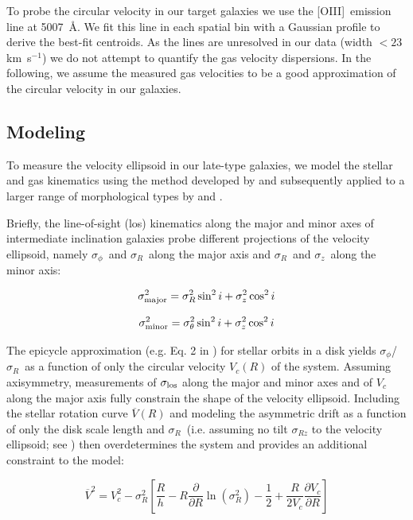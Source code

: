 \documentclass[useAMS,usenatbib]{mn2e}
\newcommand{\kms}{km~s$^{-1}$}
\newcommand{\oiii}{[O{\small III}]}			%
\newcommand{\sz}{$\sigma_z$}
\newcommand{\sr}{$\sigma_R$}
\newcommand{\st}{$\sigma_\phi$}
\begin{document}
To probe the circular velocity in our target galaxies we use the
\oiii\ emission line at 5007~\AA.  We fit this line in each spatial
bin with a Gaussian profile to derive the best-fit centroids.  As the
lines are unresolved in our data (width $<23$ \kms) we do not attempt
to quantify the gas velocity dispersions.  In the following, we assume
the measured gas velocities to be a good approximation of the circular
velocity in our galaxies.




\subsection{Modeling}
\label{Modeling}

To measure the velocity ellipsoid in our late-type galaxies, we model
the stellar and gas kinematics using the method developed by
\citet{Gerssen1997} and subsequently applied to a larger range of
morphological types by \citet{Gerssen2000} and \citet{Shapiro2003}.  

Briefly, the line-of-sight (los) kinematics along the major and minor
axes of intermediate inclination galaxies probe different projections of
the velocity ellipsoid, namely \st\ and \sr\ along the major axis and
\sr\ and \sz\ along the minor axis:

\begin{equation}
\sigma^2_{\rm major} = \sigma_R^2 \sin^2 i + \sigma_z^2 \cos^2 i
\end{equation}

\begin{equation}
\sigma^2_{\rm minor} = \sigma_\theta^2 \sin^2 i + \sigma_z^2 \cos^2 i
\end{equation}


The epicycle approximation (e.g. Eq. 2 in \citealt{Shapiro2003}) 
for stellar orbits in a disk yields \st/\sr\ as a function of only the
circular velocity $V_c(R)$ of the system.  Assuming axisymmetry,
measurements of $\sigma_{\rm los}$ along the major and minor axes and of
$V_c$ along the major axis fully constrain the shape of the velocity
ellipsoid.  Including the stellar rotation curve $\overline{V}(R)$ and
modeling the asymmetric drift as a function of only the disk scale
length and \sr\ (i.e. assuming no tilt $\sigma_{Rz}$ to the velocity
ellipsoid; see \citealt{Gerssen1997}) then overdetermines the system and
provides an additional constraint to the model:

\begin{equation}
\overline{V}^2 = V_c^2 - 
\sigma_R^2 \left[\frac{R}{h} - R \frac{\partial}{\partial R}
\ln(\sigma_R^2) - \frac{1}{2} + \frac{R}{2V_c} \frac{\partial
V_c}{\partial R} \right] 
\end{equation}
\end{document}
